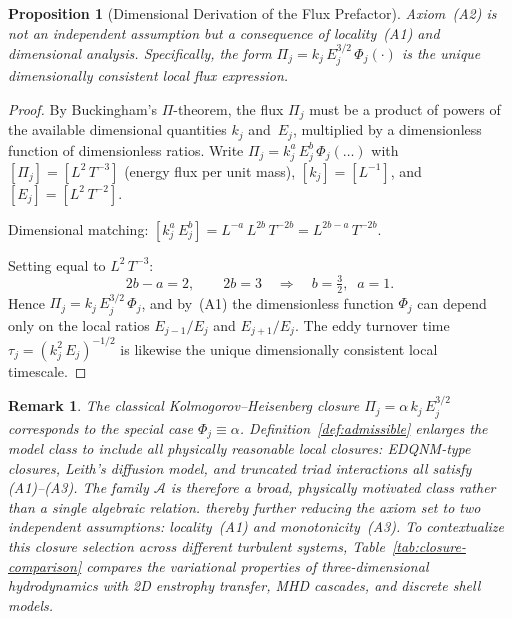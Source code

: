 \documentclass[12pt,a4paper]{article}
\theoremstyle{breakdef}
\theoremstyle{breakplain}
\newtheorem{proposition}[definition]{Proposition}
\theoremstyle{breakdef}
\newtheorem{remark}[definition]{Remark}
\begin{document}
\begin{proposition}[Dimensional Derivation of the Flux Prefactor]\label{prop:A2-derived}
Axiom~\textup{(A2)} is not an independent assumption but a consequence of locality~\textup{(A1)} and dimensional analysis. Specifically, the form $\Pi_j = k_j\,E_j^{3/2}\,\Phi_j(\cdot)$ is the \emph{unique} dimensionally consistent local flux expression.
\end{proposition}

\begin{proof}
By Buckingham's $\Pi$-theorem, the flux $\Pi_j$ must be a product of powers of the available dimensional quantities $k_j$ and~$E_j$, multiplied by a dimensionless function of dimensionless ratios. Write $\Pi_j = k_j^{a}\,E_j^{b}\,\Phi_j(\ldots)$ with $[\Pi_j] = [L^2\,T^{-3}]$ (energy flux per unit mass), $[k_j] = [L^{-1}]$, and $[E_j] = [L^2\,T^{-2}]$.

Dimensional matching: $[k_j^a\,E_j^b] = L^{-a}\,L^{2b}\,T^{-2b} = L^{2b-a}\,T^{-2b}$.

Setting equal to $L^2\,T^{-3}$:
\[
2b - a = 2, \qquad 2b = 3 \quad\Longrightarrow\quad b = \tfrac{3}{2},\;\; a = 1.
\]
Hence $\Pi_j = k_j\,E_j^{3/2}\,\Phi_j$, and by~(A1) the dimensionless function $\Phi_j$ can depend only on the local ratios $E_{j-1}/E_j$ and $E_{j+1}/E_j$. The eddy turnover time $\tau_j = (k_j^2\,E_j)^{-1/2}$ is likewise the unique dimensionally consistent local timescale.
\end{proof}

\begin{remark}
The classical Kolmogorov--Heisenberg closure $\Pi_j = \alpha\,k_j\,E_j^{3/2}$
corresponds to the special case $\Phi_j \equiv \alpha$.  Definition~\ref{def:admissible}
enlarges the model class to include all physically reasonable local closures:
EDQNM-type closures, Leith's diffusion model, and truncated triad
interactions all satisfy (A1)--(A3).  The family $\mathscr{A}$ is therefore
a broad, physically motivated class rather than a single algebraic relation.
thereby further reducing the axiom set to two independent assumptions: locality~(A1) and monotonicity~(A3). To contextualize this closure selection across different turbulent systems, Table~\ref{tab:closure-comparison} compares the variational properties of three-dimensional hydrodynamics with 2D enstrophy transfer, MHD cascades, and discrete shell models.
\end{remark}
\end{document}
